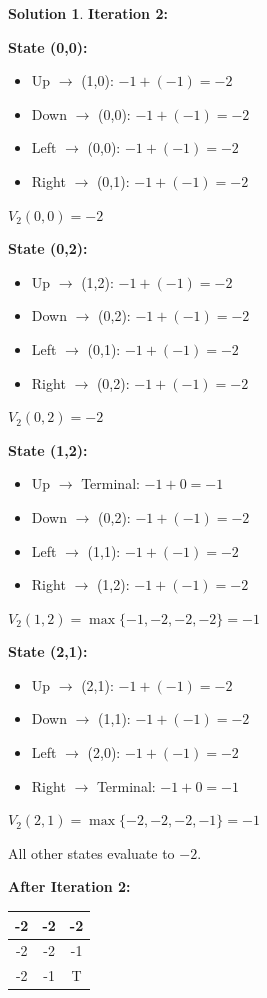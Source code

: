 \documentclass[11pt]{article}
\theoremstyle{definition}
\newtheorem*{solution}{Solution}
\begin{document}
\begin{solution}
\textbf{Iteration 2:}

\textbf{State (0,0):}
\begin{itemize}
    \item Up $\to$ (1,0): $-1 + (-1) = -2$
    \item Down $\to$ (0,0): $-1 + (-1) = -2$
    \item Left $\to$ (0,0): $-1 + (-1) = -2$
    \item Right $\to$ (0,1): $-1 + (-1) = -2$
\end{itemize}
$V_2(0,0) = -2$

\textbf{State (0,2):}
\begin{itemize}
    \item Up $\to$ (1,2): $-1 + (-1) = -2$
    \item Down $\to$ (0,2): $-1 + (-1) = -2$
    \item Left $\to$ (0,1): $-1 + (-1) = -2$
    \item Right $\to$ (0,2): $-1 + (-1) = -2$
\end{itemize}
$V_2(0,2) = -2$

\textbf{State (1,2):}
\begin{itemize}
    \item Up $\to$ Terminal: $-1 + 0 = -1$
    \item Down $\to$ (0,2): $-1 + (-1) = -2$
    \item Left $\to$ (1,1): $-1 + (-1) = -2$
    \item Right $\to$ (1,2): $-1 + (-1) = -2$
\end{itemize}
$V_2(1,2) = \max\{-1, -2, -2, -2\} = -1$

\textbf{State (2,1):}
\begin{itemize}
    \item Up $\to$ (2,1): $-1 + (-1) = -2$
    \item Down $\to$ (1,1): $-1 + (-1) = -2$
    \item Left $\to$ (2,0): $-1 + (-1) = -2$
    \item Right $\to$ Terminal: $-1 + 0 = -1$
\end{itemize}
$V_2(2,1) = \max\{-2, -2, -2, -1\} = -1$

All other states evaluate to $-2$.

\begin{center}
\textbf{After Iteration 2:}
\begin{tabular}{|c|c|c|}
\hline
-2 & -2 & -2 \\
\hline
-2 & -2 & -1 \\
\hline
-2 & -1 & T \\
\hline
\end{tabular}
\end{center}


\end{solution}
\end{document}
